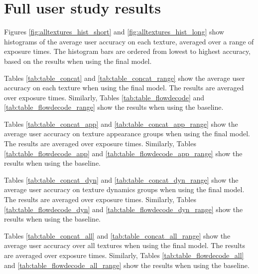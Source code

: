 \section{Full user study results}
Figures \ref{fig:alltextures_hist_short} and \ref{fig:alltextures_hist_long}
show histograms of the average user accuracy on each texture, averaged over a 
range of exposure times. The histogram bars are ordered from lowest
to highest accuracy, based on the results when using the final model.

Tables \ref{tab:table_concat} and \ref{tab:table_concat_range} show
the average user accuracy on each texture when using the final model.
The results are averaged over exposure times. Similarly, Tables
\ref{tab:table_flowdecode} and \ref{tab:table_flowdecode_range} show the results
when using the baseline.

Tables \ref{tab:table_concat_app} and \ref{tab:table_concat_app_range} show
the average user accuracy on texture appearance groups when using the
final model. The results are averaged over exposure times. Similarly, Tables
\ref{tab:table_flowdecode_app} and \ref{tab:table_flowdecode_app_range} show the results when using the baseline.

Tables \ref{tab:table_concat_dyn} and \ref{tab:table_concat_dyn_range} show
the average user accuracy on texture dynamics groups when using the
final model. The results are averaged over exposure times. Similarly, Tables
\ref{tab:table_flowdecode_dyn} and \ref{tab:table_flowdecode_dyn_range} show the results when using the baseline.

Tables \ref{tab:table_concat_all} and \ref{tab:table_concat_all_range} show
the average user accuracy over all textures when using the
final model. The results are averaged over exposure times. Similarly, Tables
\ref{tab:table_flowdecode_all} and \ref{tab:table_flowdecode_all_range} show the results when using the baseline.